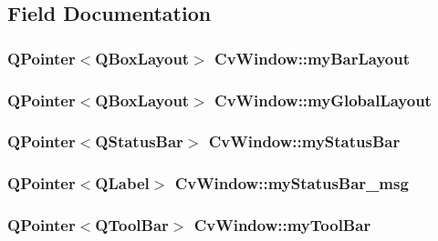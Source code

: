 \subsection{Field Documentation}
\hypertarget{classCvWindow_a1c1ba7aa00c19ca8a99da650f8bd6fb1}{
\subsubsection[{myBarLayout}]{\setlength{\rightskip}{0pt plus 5cm}QPointer$<$QBoxLayout$>$ {\bf CvWindow::myBarLayout}}}
\label{classCvWindow_a1c1ba7aa00c19ca8a99da650f8bd6fb1}
\hypertarget{classCvWindow_a706d24419e22947d0fcdcef9d3194605}{
\subsubsection[{myGlobalLayout}]{\setlength{\rightskip}{0pt plus 5cm}QPointer$<$QBoxLayout$>$ {\bf CvWindow::myGlobalLayout}}}
\label{classCvWindow_a706d24419e22947d0fcdcef9d3194605}
\hypertarget{classCvWindow_ad21a9548c597a6651b73d41a3383a1d3}{
\subsubsection[{myStatusBar}]{\setlength{\rightskip}{0pt plus 5cm}QPointer$<$QStatusBar$>$ {\bf CvWindow::myStatusBar}}}
\label{classCvWindow_ad21a9548c597a6651b73d41a3383a1d3}
\hypertarget{classCvWindow_a62c523f9df3830591bcbb44145c85db4}{
\subsubsection[{myStatusBar\_\-msg}]{\setlength{\rightskip}{0pt plus 5cm}QPointer$<$QLabel$>$ {\bf CvWindow::myStatusBar\_\-msg}}}
\label{classCvWindow_a62c523f9df3830591bcbb44145c85db4}
\hypertarget{classCvWindow_a147b82422fa5d532192990f77e6ae2d8}{
\subsubsection[{myToolBar}]{\setlength{\rightskip}{0pt plus 5cm}QPointer$<$QToolBar$>$ {\bf CvWindow::myToolBar}}}
